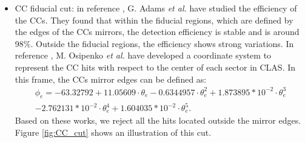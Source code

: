 \begin{itemize}
\begin{itemize}
\item CC fiducial cut: in reference \cite{CCref}, G. Adams {\it et al.} have studied the efficiency of the CCs. They found that within the fiducial regions, which are defined by the edges of the CCs mirrors, the detection efficiency is stable and is around 98$\%$. Outside the fiducial regions, the efficiency shows strong variations. In reference \cite{Osipenko}, M. Osipenko {\it et al.} have developed a coordinate system to represent the CC hits with respect to the center of each sector in CLAS. In this frame, the CCs mirror edges can be defined as:
\begin{multline}  
\phi_{e}  = -63.32792 +11.05609\cdot \theta_{e} -0.6344957\cdot \theta^{2}_{e} +1.873895*10^{-2}\cdot \theta^{3}_{e} \\
- 2.762131*10^{-2}\cdot \theta^{4}_{e}+1.604035*10^{-2}\cdot \theta^{5}_{e}. ~~~~~~~~~~~~~~~~~~~~~~~~~
\end{multline}
Based on these works, we reject all the hits located outside the mirror edges. Figure \ref{fig:CC_cut} shows an illustration of this cut.




\end{itemize}
\end{itemize}
